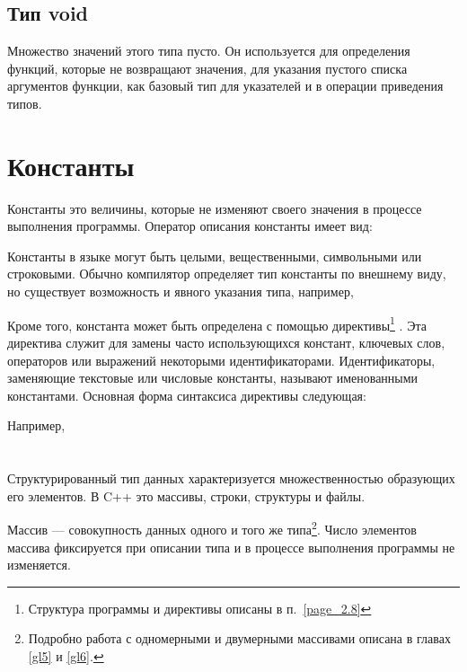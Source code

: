 
\subsection[Тип void]{Тип void}
Множество значений этого типа пусто. Он используется для определения функций, которые не возвращают значения, для
указания пустого списка аргументов функции, как базовый тип для указателей и в операции приведения типов.

\section[Константы]{Константы}
Константы это величины, которые не изменяют своего значения в процессе выполнения
программы. Оператор описания константы имеет вид:


Константы в языке  могут быть целыми, вещественными, символьными или строковыми. Обычно компилятор определяет тип
константы по внешнему виду, но существует возможность и явного указания типа, например,


Кроме того, константа может быть определена с помощью директивы\footnote{Структура программы и директивы описаны в
п.~\ref{page_2.8}}
. Эта директива служит для замены часто использующихся констант, ключевых слов,
операторов или выражений некоторыми идентификаторами. Идентификаторы, заменяющие текстовые или числовые константы,
называют {именованными константами}. Основная форма синтаксиса директивы следующая:


Например, 




\section[Структурированные типы данных]{}
Структурированный тип данных характеризуется множественностью
образующих его элементов. В C++ это массивы, строки, структуры и файлы.

Массив --- совокупность данных одного и того же типа\footnote{Подробно работа с
одномерными и двумерными массивами описана в главах \ref{gl5} и \ref{gl6}.}. Число элементов массива 
фиксируется при описании типа и в
процессе выполнения программы не изменяется.

